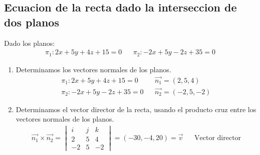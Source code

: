 \documentclass{templateNote}
\begin{document}
\newpage
\subsection{Ecuacion de la recta dado la interseccion de dos planos}
\indent
Dado los planos:
\begin{align*}
    \pi_1: 2x + 5y + 4z + 15 = 0 && 
    \pi_2: -2x + 5y - 2z + 35 = 0
\end{align*}

\begin{enumerate}
    \item Determinamos los vectores normales de los planos.
    \begin{align*}
        \pi_1: 2x + 5y + 4z + 15 = 0 && \overrightarrow{n_1} = (2, 5, 4)\\
        \pi_2: -2x + 5y - 2z + 35 = 0 && \overrightarrow{n_2} = (-2, 5, -2)
    \end{align*}
    
    \item Determinamos el vector director de la recta, usando el producto cruz entre los vectores normales de los planos.
    \begin{align*}
        \overrightarrow{n_1} \times \overrightarrow{n_2} =  \begin{vmatrix} i & j & k \\ 2 & 5 & 4 \\ -2 & 5 & -2\end{vmatrix} = (-30,-4,20)  = \overrightarrow{v}&& \text{Vector director}
    \end{align*}
    

\end{enumerate}
\end{document}

